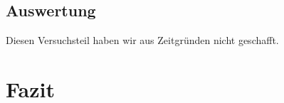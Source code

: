 \documentclass[12pt]{scrartcl}
\begin{document}
\subsection{Auswertung}
Diesen Versuchsteil haben wir aus Zeitgründen nicht geschafft.


\section{Fazit}


\end{document}
